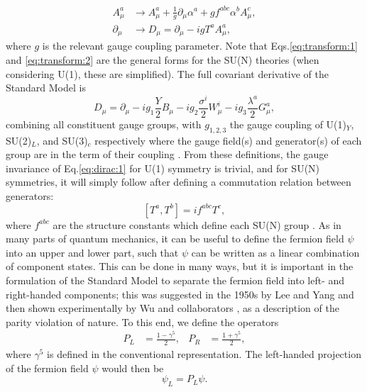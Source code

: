 \documentclass[a4paper,12pt]{article}
\begin{document}
\begin{align}
    \label{eq:transform:1}
    A^a_\mu &\to A^a_\mu + \frac{1}{g}\partial_\mu\alpha^a + gf^{abc}\alpha^bA^c_\mu, \\
    \label{eq:transform:2}
    \partial_\mu &\to D_\mu = \partial_\mu - igT^aA^a_\mu,
\end{align}
where $g$ is the relevant gauge coupling parameter.
Note that Eqs.\eqref{eq:transform:1} and \eqref{eq:transform:2} are the general forms for the SU(N) theories (when considering U(1), these are simplified).
The full covariant derivative of the Standard Model is
\begin{equation}
    \label{eq:covar}
    D_\mu = \partial_\mu - ig_1\frac{Y}{2}B_\mu - ig_2\frac{\sigma^i}{2}W^i_\mu - ig_3\frac{\lambda^a}{2}G^a_\mu,
\end{equation}
combining all constituent gauge groups, with $g_{1,2,3}$ the gauge coupling of U(1)$_Y$, SU(2)$_L$, and SU(3)$_c$ respectively where the gauge field(s) and generator(s) of each group are in the term of their coupling \cite{kane}.   
From these definitions, the gauge invariance of Eq.\eqref{eq:dirac:1} for U(1) symmetry is trivial, and for SU(N) symmetries, it will simply follow after defining a commutation relation between generators:
\begin{equation}
    \label{eq:commute}
    [T^a,T^b] = if^{abc}T^c,
\end{equation}
where $f^{abc}$ are the structure constants which define each SU(N) group \cite{bail}. 
As in many parts of quantum mechanics, it can be useful to define the fermion field $\psi$ into an upper and lower part, such that $\psi$ can be written as a linear combination of component states. 
This can be done in many ways, but it is important in the formulation of the Standard Model to separate the fermion field into left- and right-handed components; this was suggested in the 1950s by Lee and Yang \cite{lee} and then shown experimentally by Wu and collaborators \cite{wu}, as a description of the parity violation of nature. 
To this end, we define the operators
\begin{align}
    \label{eq:helix}
    P_L &= \frac{1-\gamma^5}{2}, & P_R &= \frac{1+\gamma^5}{2},
\end{align}
where $\gamma^5$ is defined in the conventional representation. 
The left-handed projection of the fermion field $\psi$ would then be
\begin{equation}
    \label{eq:projection}
    \psi_L = P_L\psi.
\end{equation}
\end{document}
